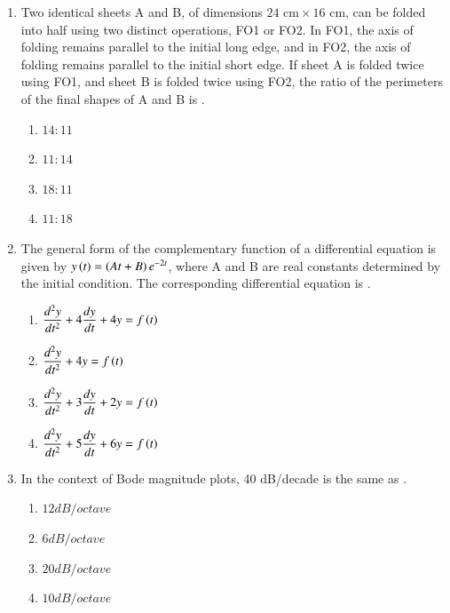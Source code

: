 \documentclass[journal,12pt,onecolumn]{IEEEtran}
\theoremstyle{remark}
\begin{document}
\begin{enumerate}
\item Two identical sheets A and B, of dimensions $24 \text{ cm} \times 16$ cm, can be folded into half using two distinct operations, FO1 or FO2. In FO1, the axis of folding remains parallel to the initial long edge, and in FO2, the axis of folding remains parallel to the initial short edge. If sheet A is folded twice using FO1, and sheet B is folded twice using FO2, the ratio of the perimeters of the final shapes of A and B is \underline{\hspace{2cm}}.
\hfill{}
\begin{multicols}{2}
\begin{enumerate}
    \item $14:11$
    \item $11:14$
    \item $18:11$
    \item $11:18$
\end{enumerate}
\end{multicols}

\item The general form of the complementary function of a differential equation is given by $y\left(t\right)=\left(At+B\right)e^{-2t}$, where A and B are real constants determined by the initial condition. The corresponding differential equation is \underline{\hspace{2cm}}.
\hfill{}
\begin{enumerate}
    \item $\dfrac{d^{2}y}{dt^{2}}+4\dfrac{dy}{dt}+4y=f\left(t\right)$
    \item $\dfrac{d^{2}y}{dt^{2}}+4y=f\left(t\right)$
    \item $\dfrac{d^{2}y}{dt^{2}}+3\dfrac{dy}{dt}+2y=f\left(t\right)$
    \item $\dfrac{d^{2}y}{dt^{2}}+5\dfrac{dy}{dt}+6y=f\left(t\right)$
\end{enumerate}

\item In the context of Bode magnitude plots, 40 dB/decade is the same as \underline{\hspace{2cm}}.
\hfill{}
\begin{multicols}{2}
\begin{enumerate}
    \item $12 dB/octave$
    \item $6 dB/octave$
    \item $20 dB/octave$
    \item $10 dB/octave$
\end{enumerate}
\end{multicols}


\end{enumerate}
\end{document}
